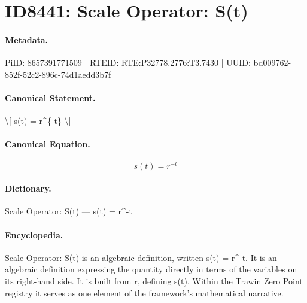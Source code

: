 \section*{ID8441: Scale Operator: S(t)}
\paragraph{Metadata.}
PiID: 8657391771509 | RTEID: RTE:P32778.2776:T3.7430 | UUID: bd009762-852f-52c2-896c-74d1aedd3b7f

\paragraph{Canonical Statement.}
\textbackslash{}[ s(t) = r\textasciicircum{}\{-t\} \textbackslash{}]

\paragraph{Canonical Equation.}
\[
s(t) = r^{-t}
\]

\paragraph{Dictionary.}
Scale Operator: S(t) — s(t) = r\textasciicircum{}-t

\paragraph{Encyclopedia.}
Scale Operator: S(t) is an algebraic definition, written s(t) = r\textasciicircum{}-t. It is an algebraic definition expressing the quantity directly in terms of the variables on its right-hand side. It is built from r, defining s(t). Within the Trawin Zero Point registry it serves as one element of the framework's mathematical narrative.
